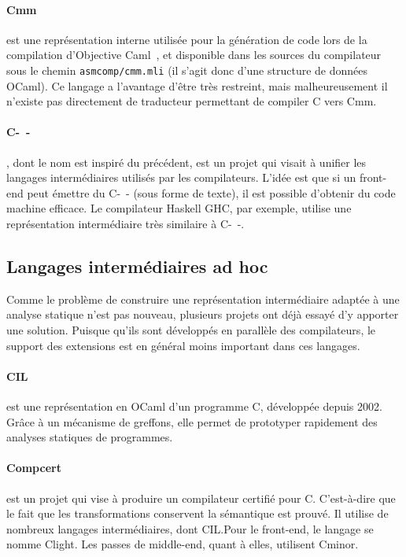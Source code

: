 \paragraph{Cmm} est une représentation interne utilisée pour la génération de
code lors de la compilation d'Objective Caml~, et disponible
dans les sources du compilateur sous le chemin \texttt{asmcomp/cmm.mli} (il
s'agit donc d'une structure de données OCaml). Ce langage a l'avantage d'être
très restreint, mais malheureusement il n'existe pas directement de traducteur
permettant de compiler C vers Cmm.

\paragraph{C-~-}\cite{spjcmm} , dont le nom est inspiré du précédent,
est un projet qui visait à unifier les langages intermédiaires utilisés par les
compilateurs. L'idée est que si un front-end peut émettre du C-~- (sous forme de
texte), il est possible d'obtenir du code machine efficace. Le compilateur
Haskell GHC, par exemple, utilise une représentation intermédiaire très
similaire à C-~-.

\subsection*{Langages intermédiaires ad hoc}

Comme le problème de construire une représentation intermédiaire adaptée à une
analyse statique n'est pas nouveau, plusieurs projets ont déjà essayé d'y
apporter une solution. Puisque qu'ils sont développés en parallèle des
compilateurs, le support des extensions est en général moins important dans ces
langages.

\paragraph{CIL}\cite{NeculaCil}  est une représentation en
OCaml d'un programme C, développée depuis 2002. Grâce à un mécanisme de
greffons, elle permet de prototyper rapidement des analyses statiques de
programmes.

\paragraph{Compcert} est un projet qui vise à produire un compilateur certifié
pour C. C'est-à-dire que le fait que les transformations conservent la
sémantique est prouvé. Il utilise de nombreux langages intermédiaires, dont
CIL.\@ Pour le front-end, le langage se nomme Clight\cite{cfront}. Les passes de
middle-end, quant à elles, utilisent Cminor\cite{cminorSL}.

